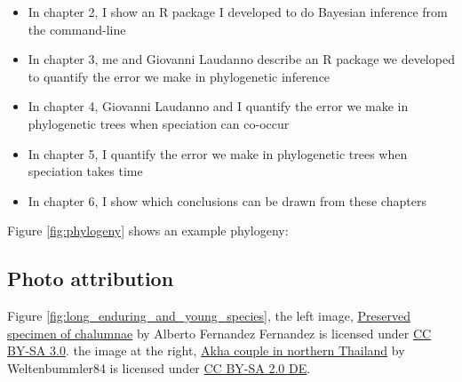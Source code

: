 \begin{itemize}
	\item In chapter 2, I show an R package I developed to do Bayesian
    inference from the command-line
	\item In chapter 3, me and Giovanni Laudanno describe an R package we 
    developed to quantify the error we make in phylogenetic inference
	\item In chapter 4, Giovanni Laudanno and I quantify the error we make 
    in phylogenetic trees when speciation can co-occur
	\item In chapter 5, I quantify the error we make 
    in phylogenetic trees when speciation takes time
	\item In chapter 6, I show which conclusions can be drawn from these chapters
\end{itemize}




Figure \ref{fig:phylogeny} shows an example phylogeny:




\subsection{Photo attribution}

Figure \ref{fig:long_enduring_and_young_species},
the left image,
\href{https://en.wikipedia.org/wiki/File:Latimeria_Chalumnae_-_Coelacanth_-_NHMW.jpg}{Preserved specimen of chalumnae}
by Alberto Fernandez Fernandez
is licensed under \href{https://creativecommons.org/licenses/by-sa/3.0/deed.en}{CC BY-SA 3.0}.
the image at the right,
\href{https://commons.wikimedia.org/wiki/File:Akha_cropped_hires.JPG}{Akha couple in northern Thailand}
by Weltenbummler84
is licensed under \href{https://creativecommons.org/licenses/by-sa/2.0/de/deed.en}{CC BY-SA 2.0 DE}.

